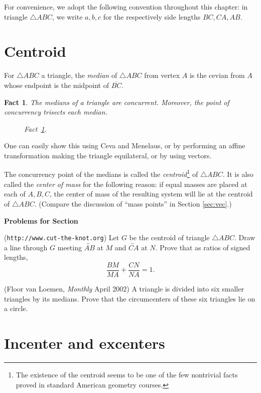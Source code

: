 \documentclass[12pt]{book}
\newcounter{exc}
\numberwithin{exc}{section}
\numberwithin{figure}{section}
\newenvironment{exer}{\vspace{0.1in}
\noindent \textbf{Problems for Section~\thesection} \vspace{0.1in}
\begin{list}{\arabic{exc}.}{\usecounter{exc}}}{\end{list}}
\newtheorem{fact}[theorem]{Fact}
\numberwithin{equation}{theorem}
\def\ii{\item}
\def\line#1{\overleftrightarrow{#1}}
\def\seg#1{\overline{#1}}
\begin{document}
For convenience, we adopt the following convention throughout this
chapter: in triangle $\triangle ABC$, we write $a,b,c$ for the respectively
side lengths $BC,CA,AB$.

\section{Centroid}

For $\triangle ABC$ a triangle, the \emph{median} 
 of $\triangle ABC$ from vertex $A$
is the cevian 
from $A$ whose endpoint is the midpoint of $\seg{BC}$.
\begin{fact} \label{fact:centroid}
The medians of a triangle are concurrent. Moreover, the point of 
concurrency trisects each median.
\begin{figure}[ht]
\caption{Fact~\ref{fact:centroid}.}
\end{figure}
\end{fact}
One can easily show this using Ceva and Menelaus, or by performing an 
affine transformation making the triangle equilateral, or by using vectors. 

The concurrency point of the medians is called the \emph{centroid}\footnote{The
existence of the centroid
seems to be one of the few nontrivial facts proved in standard 
American geometry courses.}
 of $\triangle ABC$. It is
also called the \emph{center of mass}  for the following reason:
if equal masses are placed at each of $A, B, C$,
the center of mass of the resulting system will lie at the centroid
of $\triangle ABC$.
(Compare the discussion of ``mass points''
 in Section \ref{sec:vec}.)

\begin{exer}
\ii (\texttt{http://www.cut-the-knot.org})
Let $G$ be the centroid of triangle $\triangle ABC$.
Draw a line through $G$ meeting $\line{AB}$ at $M$ and $\line{CA}$ at $N$.
Prove that as ratios of signed lengths, 
\[
\frac{BM}{MA} + \frac{CN}{NA} = 1.
\]
\ii (Floor van Loemen, \textit{Monthly} April 2002)
A triangle is divided into six smaller triangles by its medians. Prove
that the circumcenters of these six triangles lie on a circle.
\end{exer}

\section{Incenter and excenters}
\end{document}
